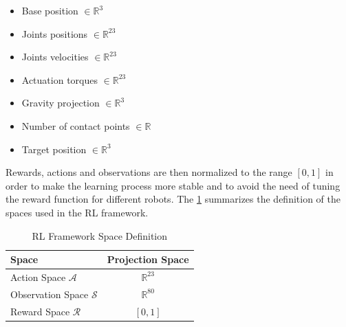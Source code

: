 \begin{itemize}
    \item Base position $\in \mathbb{R} ^{3}$
    \item Joints positions $\in \mathbb{R} ^{23}$
    \item Joints velocities $\in \mathbb{R} ^{23}$
    \item Actuation torques $\in \mathbb{R} ^{23}$
    \item Gravity projection $\in \mathbb{R} ^{3}$
    \item Number of contact points $\in \mathbb{R}$
    \item Target position $\in \mathbb{R} ^{3}$
\end{itemize}

Rewards, actions and observations are then normalized to the range $[0,1]$ in order to make the learning process more stable and to avoid the need of tuning the reward function for different robots. The \cref{tab:rlspacedef} summarizes the definition of the spaces used in the \ac{RL} framework.

\begin{table}[]
    \centering
    \begin{tabular}{l c}
        \toprule
        Space                           & Projection Space   \\
        \midrule
        Action Space $\mathcal{A}$      & $\mathbb{R} ^{23}$ \\
        Observation Space $\mathcal{S}$ & $\mathbb{R} ^{80}$ \\
        Reward Space $\mathcal{R}$      & $[0,1]$            \\
        \bottomrule
    \end{tabular}
    \caption{RL Framework Space Definition}
    \label{tab:rlspacedef}
\end{table}


